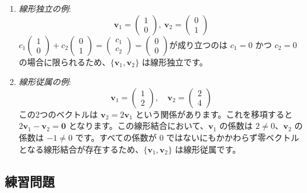 \begin{ex}
\begin{enumerate}
\item \emph{線形独立の例}:\\
    \[\bm{v}_1 = \begin{pmatrix} 1 \\ 0 \end{pmatrix},\ \bm{v}_2 = \begin{pmatrix} 0 \\ 1 \end{pmatrix}\]
    $c_1 \begin{pmatrix} 1 \\ 0 \end{pmatrix} + c_2 \begin{pmatrix} 0 \\ 1 \end{pmatrix} = \begin{pmatrix} c_1 \\ c_2 \end{pmatrix} = \begin{pmatrix} 0 \\ 0 \end{pmatrix}$が成り立つのは $c_1=0$ かつ $c_2=0$ の場合に限られるため、$\{\bm{v}_1, \bm{v}_2\}$ は線形独立です。
\item \emph{線形従属の例}:\\
    \[\bm{v}_1 = \begin{pmatrix} 1 \\ 2 \end{pmatrix}, \quad \bm{v}_2 = \begin{pmatrix} 2 \\ 4 \end{pmatrix}\]
    この2つのベクトルは $\bm{v}_2 = 2\bm{v}_1$ という関係があります。これを移項すると $2\bm{v}_1 - \bm{v}_2 = \bm{0}$ となります。この線形結合において、$\bm{v}_1$ の係数は $2 \neq 0$、$\bm{v}_2$ の係数は $-1 \neq 0$ です。すべての係数が $0$ ではないにもかかわらず零ベクトルとなる線形結合が存在するため、$\{\bm{v}_1, \bm{v}_2\}$ は線形従属です。
\end{enumerate}
\end{ex}

\subsection{練習問題}

